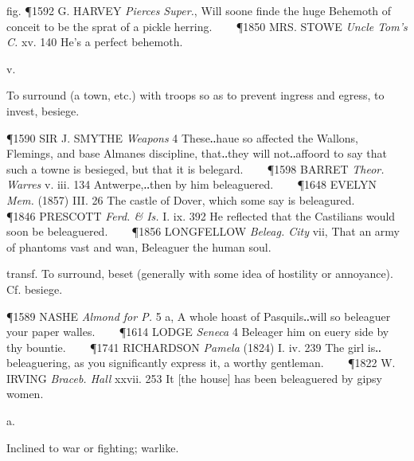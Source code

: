\begin{description}[wide, labelwidth=!, labelindent=0pt]
\noindent fig. \P 1592 G. HARVEY  \textit{Pierces Super.}, Will soone finde the huge Behemoth of conceit to be the sprat of a pickle herring.    
\P 1850 MRS. STOWE  \textit{Uncle Tom's C.} xv. 140 He's a perfect behemoth.


 v.

\noindent {}


\vspace{-0.3cm}

\begin{myenumerate}

 To surround (a town, etc.) with troops so as to prevent ingress and egress, to invest, besiege.

\P 1590 SIR J. SMYTHE  \textit{Weapons} 4 These‥haue so affected the Wallons, Flemings, and base Almanes discipline, that‥they will not‥affoord to say that such a towne is besieged, but that it is belegard.    
\P 1598 BARRET  \textit{Theor. Warres} v. iii. 134 Antwerpe,‥then by him beleaguered.    
\P 1648 EVELYN  \textit{Mem.} (1857) III. 26 The castle of Dover, which some say is beleagured.    
\P 1846 PRESCOTT  \textit{Ferd. \& Is.} I. ix. 392 He reflected that the Castilians would soon be beleaguered.    
\P 1856 LONGFELLOW  \textit{Beleag. City} vii, That an army of phantoms vast and wan, Beleaguer the human soul.

 transf. To surround, beset (generally with some idea of hostility or annoyance). Cf. besiege.

\P 1589 NASHE  \textit{Almond for P.} 5 a, A whole hoast of Pasquils‥will so beleaguer your paper walles.    
\P 1614 LODGE  \textit{Seneca} 4 Beleager him on euery side by thy bountie.    
\P 1741 RICHARDSON  \textit{Pamela} (1824) I. iv. 239 The girl is‥beleaguering, as you significantly express it, a worthy gentleman.    
\P 1822 W. IRVING  \textit{Braceb. Hall} xxvii. 253 It [the house] has been beleaguered by gipsy women.
\end{myenumerate}


 a.

\noindent {}


\noindent Inclined to war or fighting; warlike.


\end{description}
